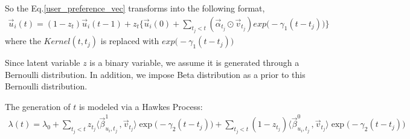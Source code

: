 \documentclass[11pt]{article}
\begin{document}
So the Eq.\ref{user_preference_vec} transforms into the following format,
\begin{align}
\label{user_preference_vec_z}
\vec{u}_i(t) = (1-z_t)\vec{u}_i(t-1)+z_t\big\{ \vec{u}_i(0)+\sum_{t_j<t} (\vec{\alpha}_{t_j}\odot\vec{v}_{t_j}) exp\big(-\gamma_1 (t-t_j)\big)\big\}
\end{align}
where the $Kernel(t,t_j)$ is replaced with $exp\big(-\gamma_1 (t-t_j)\big)$

Since latent variable $z$ is a binary variable, we assume it is generated through a Bernoulli distribution. In addition, we impose Beta distribution as a prior to this Bernoulli distribution.

The generation of $t$ is modeled via a Hawkes Process:
\begin{align}
\lambda(t) = \lambda_0+\sum_{t_j<t} z_{t_j}\langle\vec{\beta}_{u_i,t_j}^1\,,\vec{v}_{t_j}\rangle\exp\big(-\gamma_2 (t-t_j)\big) +\sum_{t_j<t} (1-z_{t_j})\langle\vec{\beta}_{u_i, t_j}^0\,,\vec{v}_{t_j}\rangle \exp\big(-\gamma_2 (t-t_j)\big)
\end{align}





\end{document}
